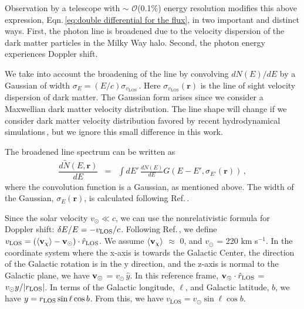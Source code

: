 \documentclass[aps,prd,10pt,twocolumn,superscriptaddress,showpacs]{revtex4-1}
\newcommand{\br}[0]{\mathbf{r}}
\newcommand{\los}[0]{\mathrm{LOS}}
\begin{document}
Observation by a telescope with $\sim$ $\mathcal{O}$(0.1\%) energy resolution modifies this above expression, Eqn.\,\ref{eq:double differential for the flux}, in two important and distinct ways.  First, the photon line is broadened due to the velocity dispersion of the dark matter particles in the Milky Way halo.  Second, the photon energy experiences Doppler shift.  

We take into account the broadening of the line by convolving $dN(E)/dE$ by a Gaussian of width
$\sigma_E = (E/c) \sigma_{v_\los}$\,\cite{speckhard2016}.  Here $\sigma_{v_\los}(\br)$ 
is the line of sight velocity dispersion of dark matter.  The Gaussian form arises 
since we consider a Maxwellian dark matter velocity distribution.  The line shape will change if we 
consider dark matter velocity distribution favored by recent hydrodynamical simulations\,\cite{Bozorgnia:2016ogo,Sloane:2016kyi,Kelso:2016qqj}, 
but we ignore this small difference in this work.  

The broadened line spectrum can be written as 
\begin{eqnarray}
	\dfrac{d \tilde{N} (E, \br)}{dE} &=& \int dE' \, \frac{dN(E)}{dE}  G(E - E', \sigma_{E'} (\br)) \, ,
\label{eq:formula for modified dNdE}
\end{eqnarray}
where the convolution function is a Gaussian, as mentioned above.  The width of the Gaussian,
$\sigma_E(\br)$, is calculated following Ref.\,\cite{speckhard2016}.

Since the solar velocity $v_\odot \ll c$, we can use the nonrelativistic formula for Doppler shift: $\delta
E/E = - v_{\rm LOS}/c$.  Following Ref.\,\cite{speckhard2016}, we define $v_{\rm LOS} = (\langle
{\bf v}_\chi \rangle - {\bf v}_\odot) \cdot \hat{r}_{\rm LOS}$.  We assume $\langle {\bf v}_\chi
\rangle$ $\approx$ 0, and $v_\odot$ = 220 km s$^{-1}$.  In the coordinate system where the x-axis is
towards the Galactic Center, the direction of the Galactic rotation is in the y direction, and the
z-axis is normal to the Galactic plane, we have ${\bf v}_\odot$ = $v_\odot \, \hat{y}$.  In this
reference frame, ${\bf v}_\odot \cdot \hat{r}_{\rm LOS}$ = $v_\odot y / |r_{\rm LOS}|$.  In terms of
the Galactic longitude, $\ell$, and Galactic latitude, $b$, we have $y = r_{\rm LOS} \, {\rm sin} \,
\ell \, {\rm cos} \, b$.  From this, we have $v_\los = v_\odot \sin \ell\cos b$.
\end{document}
